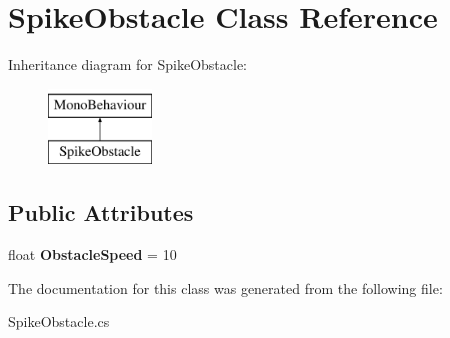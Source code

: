 \hypertarget{classSpikeObstacle}{\section{Spike\-Obstacle Class Reference}
\label{classSpikeObstacle}
}
Inheritance diagram for Spike\-Obstacle\-:\begin{figure}[H]
\begin{center}
\leavevmode
\includegraphics[height=2.000000cm]{classSpikeObstacle}
\end{center}
\end{figure}
\subsection*{Public Attributes}
\begin{DoxyCompactItemize}
\item 
\hypertarget{classSpikeObstacle_a26d288c6a9359617d93199c43e40347c}{float {\bfseries Obstacle\-Speed} = 10}\label{classSpikeObstacle_a26d288c6a9359617d93199c43e40347c}

\end{DoxyCompactItemize}


The documentation for this class was generated from the following file\-:\begin{DoxyCompactItemize}
\item 
Spike\-Obstacle.\-cs\end{DoxyCompactItemize}
